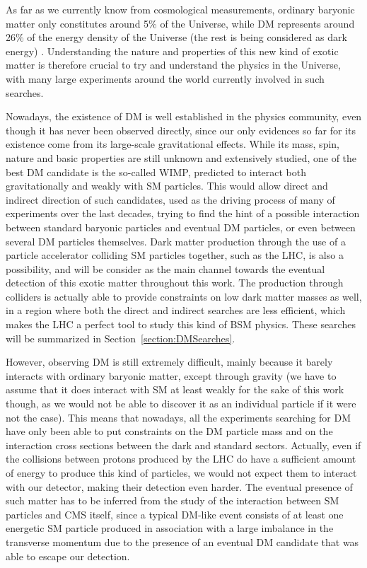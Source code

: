 \documentclass[a4paper, 10pt, openright]{report}
\begin{document}
As far as we currently know from cosmological measurements, ordinary baryonic matter only constitutes around 5\% of the Universe, while  \ac{DM} represents around 26\% of the energy density of the Universe (the rest is being considered as dark energy) \cite{Repartition}. Understanding the nature and properties of this new kind of exotic matter is therefore crucial to try and understand the physics in the Universe, with many large experiments around the world currently involved in such searches. 

Nowadays, the existence of \ac{DM} is well established in the physics community, even though it has never been observed directly, since our only evidences so far for its existence come from its large-scale gravitational effects. While its mass, spin, nature and basic properties are still unknown and extensively studied, one of the best \ac{DM} candidate is the so-called \ac{WIMP}, predicted to interact both gravitationally and weakly with \ac{SM} particles. This would allow direct and indirect direction of such candidates, used as the driving process of many of experiments over the last decades, trying to find the hint of a possible interaction between standard baryonic particles and eventual \ac{DM} particles, or even between several \ac{DM} particles themselves. Dark matter production through the use of a particle accelerator colliding \ac{SM} particles together, such as the \ac{LHC}, is also a possibility, and will be consider as the main channel towards the eventual detection of this exotic matter throughout this work. The production through colliders is actually able to provide constraints on low dark matter masses as well, in a region where both the direct and indirect searches are less efficient, which makes the \ac{LHC} a perfect tool to study this kind of \ac{BSM} physics. These searches will be summarized in Section~\ref{section:DMSearches}.

However, observing \ac{DM} is still extremely difficult, mainly because it barely interacts with ordinary baryonic matter, except through gravity (we have to assume that it does interact with \ac{SM} at least weakly for the sake of this work though, as we would not be able to discover it as an individual particle if it were not the case). This means that nowadays, all the experiments searching for \ac{DM} have only been able to put constraints on the \ac{DM} particle mass and on the interaction cross sections between the dark and standard sectors. Actually, even if the collisions between protons produced by the LHC do have a sufficient amount of energy to produce this kind of particles, we would not expect them to interact with our detector, making their detection even harder. The eventual presence of such matter has to be inferred from the study of the interaction between \ac{SM} particles and \ac{CMS} itself, since a typical \ac{DM}-like event consists of at least one energetic \ac{SM} particle produced in association with a large imbalance in the transverse momentum due to the presence of an eventual \ac{DM} candidate that was able to escape our detection. %
\end{document}
